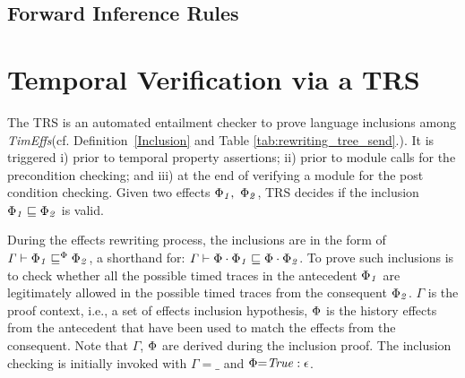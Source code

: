 \documentclass[acmsmall,10pt,review]{acmart}
\newcommand{\timedEffects}{\emph{TimEffs}}
\newcommand{\effect}{\textcolor{black}{\ensuremath{\mathrm{\Phi}}}}
\newcommand{\code}[1]{{\tt{\ensuremath{\m{#1}}}}}
\newcommand{\empt}{\textcolor{black}{\ensuremath{\epsilon}}}
\newcommand{\CONTAIN}{\sqsubseteq}
\newcommand{\m}{\mathit}
\newcommand\figref[1]{Fig. \textcolor{black}{\ref{#1}}.}
\newcommand\tabref[1]{Table \textcolor{black}{\ref{#1}}.}
\newcommand\defref[1]{Definition~\textcolor{blue}{\ref{#1}}}
\begin{document}
{%











\subsection{Forward Inference Rules}
\label{Forward_Rules}

     




\section{Temporal Verification via a TRS}
\label{sec:Entailment_Prover}


The TRS  is an automated entailment checker to prove language inclusions among \timedEffects (cf. \defref{Inclusion} and \tabref{tab:rewriting_tree_send}). It is triggered i) prior to temporal property assertions; ii) prior to module calls for the precondition checking; and iii) at the end of verifying a module for the post condition checking. Given two effects \code{\effect_1,\ \effect_2}, TRS decides if the inclusion \code{\effect_1 \CONTAIN  \effect_2 } is valid. 

During the effects rewriting process, the inclusions are in the form of \code{\Gamma \vdash  \effect_1 \CONTAIN^{\effect}  \effect_2 }, a shorthand for: \code{\Gamma \vdash  \effect \cdot \effect_1 \CONTAIN   \effect \cdot  \effect_2}. To prove such inclusions is to check whether all the possible timed traces in the antecedent \code{\effect_1} are legitimately allowed  in the possible timed traces from the consequent \code{\effect_2}.
\code{\Gamma} is the proof context, i.e., a set of effects inclusion hypothesis, \code{\effect} is the history effects from the antecedent that have been used to match the effects from the consequent.
Note that \code{\Gamma}, \code{\effect} are derived during the inclusion proof. 
The inclusion checking is initially invoked with \code{\Gamma{=}\_} and \code{\effect{=} True : \empt}. 







}
\end{document}
